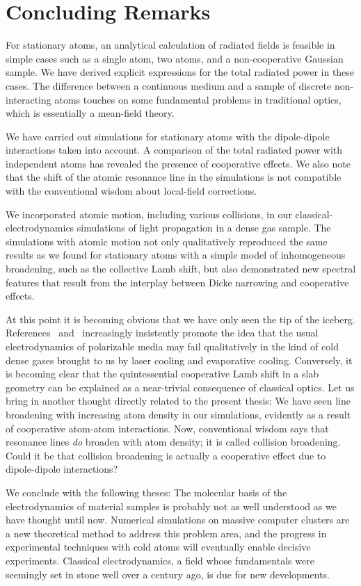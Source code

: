 \chapter{Concluding Remarks}
For stationary atoms, an analytical calculation of radiated fields is feasible in simple cases such as a single atom, two atoms, and a non-cooperative Gaussian sample. We have derived explicit expressions for the total radiated power in these cases. The difference between a continuous medium and a sample of discrete non-interacting atoms touches on some fundamental problems in traditional optics, which is essentially a mean-field theory.

We have carried out simulations for stationary atoms with the dipole-dipole interactions taken into account. A comparison of the total radiated power with independent atoms has revealed the presence of cooperative effects. We also note that the shift of the atomic resonance line in the simulations is not compatible with the conventional wisdom about local-field corrections.

We incorporated atomic motion, including various collisions, in our classical-electrodynamics simulations of light propagation in a dense gas sample. The simulations with atomic motion not only qualitatively reproduced the same results as we found for stationary atoms with a simple model of inhomogeneous broadening, such as the collective Lamb shift, but also demonstrated new spectral features that result from the interplay between Dicke narrowing and cooperative effects.

At this point it is becoming obvious that we have only seen the tip of the iceberg. References~\cite{PhysRevLett.112.113603} and~\cite{Javanainen:16} increasingly insistently promote the idea that the usual electrodynamics of polarizable media may fail qualitatively in the kind of cold dense gases brought to us by laser cooling and evaporative cooling. Conversely, it is becoming clear that the quintessential cooperative Lamb shift in a slab geometry can be explained as a near-trivial consequence of classical optics. Let us bring in another thought directly related to the present thesis: We have seen line broadening with increasing atom density in our simulations, evidently as a result of cooperative atom-atom interactions. Now, conventional wisdom says that resonance lines {\em do\/} broaden with atom density; it is called collision broadening. Could it be that collision broadening is actually a cooperative effect due to dipole-dipole interactions?

We conclude with the following theses: The molecular basis of the electrodynamics of material samples is probably not as well understood as we have thought until now. Numerical simulations on massive computer clusters are a new theoretical method to address this problem area, and the progress in experimental techniques with cold atoms will eventually enable decisive experiments. Classical electrodynamics, a field whose fundamentals were seemingly set in stone well over a century ago, is due for new developments.
